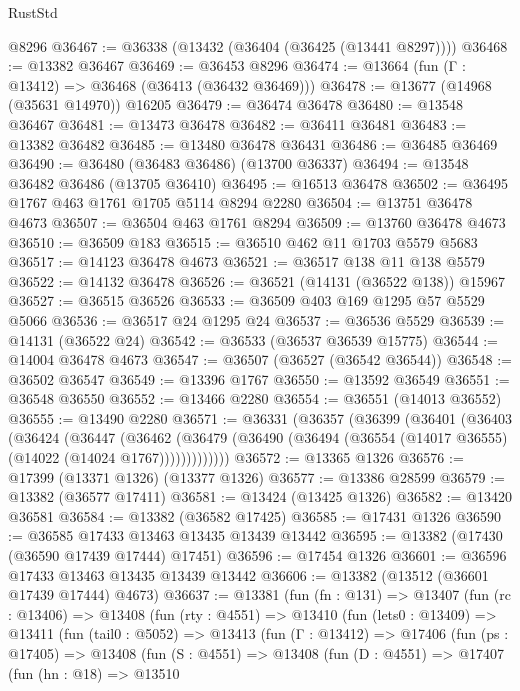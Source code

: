 \begin{lexlean}{RustStd}
\begin{coremodule}
    @8296
@36467 := @36338 (@13432 (@36404 (@36425 (@13441 @8297))))
@36468 := @13382 @36467
@36469 := @36453 @8296
@36474 := @13664 (fun (Γ : @13412) => @36468 (@36413 (@36432 @36469)))
@36478 := @13677 (@14968 (@35631 @14970)) @16205
@36479 := @36474 @36478
@36480 := @13548 @36467
@36481 := @13473 @36478
@36482 := @36411 @36481
@36483 := @13382 @36482
@36485 := @13480 @36478 @36431
@36486 := @36485 @36469
@36490 := @36480 (@36483 @36486) (@13700 @36337)
@36494 := @13548 @36482 @36486 (@13705 @36410)
@36495 := @16513 @36478
@36502 := @36495 @1767 @463 @1761 @1705 @5114 @8294 @2280
@36504 := @13751 @36478 @4673
@36507 := @36504 @463 @1761 @8294
@36509 := @13760 @36478 @4673
@36510 := @36509 @183
@36515 := @36510 @462 @11 @1703 @5579 @5683
@36517 := @14123 @36478 @4673
@36521 := @36517 @138 @11 @138 @5579
@36522 := @14132 @36478
@36526 := @36521 (@14131 (@36522 @138)) @15967
@36527 := @36515 @36526
@36533 := @36509 @403 @169 @1295 @57 @5529 @5066
@36536 := @36517 @24 @1295 @24
@36537 := @36536 @5529
@36539 := @14131 (@36522 @24)
@36542 := @36533 (@36537 @36539 @15775)
@36544 := @14004 @36478 @4673
@36547 := @36507 (@36527 (@36542 @36544))
@36548 := @36502 @36547
@36549 := @13396 @1767
@36550 := @13592 @36549
@36551 := @36548 @36550
@36552 := @13466 @2280
@36554 := @36551 (@14013 @36552)
@36555 := @13490 @2280
@36571 := @36331
    (@36357
      (@36399
        (@36401
          (@36403
            (@36424
              (@36447
                (@36462
                  (@36479 (@36490 (@36494 (@36554 (@14017 @36555) (@14022 (@14024 @1767)))))))))))))
@36572 := @13365 @1326
@36576 := @17399 (@13371 @1326) (@13377 @1326)
@36577 := @13386 @28599
@36579 := @13382 (@36577 @17411)
@36581 := @13424 (@13425 @1326)
@36582 := @13420 @36581
@36584 := @13382 (@36582 @17425)
@36585 := @17431 @1326
@36590 := @36585 @17433 @13463 @13435 @13439 @13442
@36595 := @13382 (@17430 (@36590 @17439 @17444) @17451)
@36596 := @17454 @1326
@36601 := @36596 @17433 @13463 @13435 @13439 @13442
@36606 := @13382 (@13512 (@36601 @17439 @17444) @4673)
@36637 := @13381
    (fun (fn : @131) =>
    @13407
      (fun (rc : @13406) =>
      @13408
        (fun (rty : @4551) =>
        @13410
          (fun (lets0 : @13409) =>
          @13411
            (fun (tail0 : @5052) =>
            @13413
              (fun (Γ : @13412) =>
              @17406
                (fun (ps : @17405) =>
                @13408
                  (fun (S : @4551) =>
                  @13408
                    (fun (D : @4551) =>
                    @17407
                      (fun (hn : @18) =>
                      @13510

\end{coremodule}
\end{lexlean}
